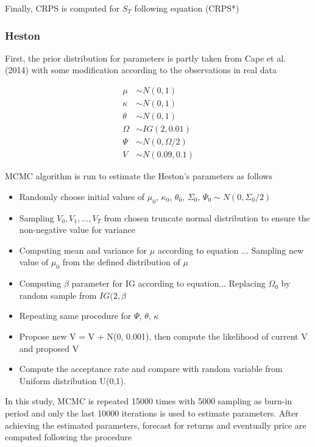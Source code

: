 \documentclass[12pt,a4paper]{article}
\numberwithin{equation}{section}
\begin{document}
Finally, CRPS is computed for $S_T$ following equation (CRPS*)

\subsubsection{Heston}

First, the prior distribution for parameters is partly taken from Cape et al. (2014) with some modification according to the observations in real data

\begin{align*}
\mu &\sim N(0,1) \\
\kappa &\sim N(0,1) \\
\theta &\sim N(0,1) \\
\Omega &\sim IG(2, 0.01) \\
\Psi &\sim N(0, \Omega/2) \\
V &\sim N(0.09, 0.1) 
\end{align*}

MCMC algorithm is run to estimate the Heston's parameters as follows

\begin{itemize}
\item Randomly choose initial values of $\mu_0$, $\kappa_0$, $\theta_0$, $\Sigma_0$, $\Psi_0 \sim N(0, \Sigma_0/2)$
\item Sampling $V_0, V_1, ..., V_T$ from chosen truncate normal distribution to ensure the non-negative value for variance 
\item Computing mean and variance for $\mu$ according to equation ... Sampling new value of $\mu_0$ from the defined distribution of $\mu$
\item Computing $\beta$ parameter for IG according to equation... Replacing $\Omega_0$ by random sample from $IG(2, \beta$
\item Repeating same procedure for $\Psi$, $\theta$, $\kappa$
\item Propose new V = V + N(0, 0.001), then compute the likelihood of current V and proposed V
\item Compute the acceptance rate and compare with random variable from Uniform distribution U(0,1).
\end{itemize}

In this study, MCMC is repeated 15000 times with 5000 sampling as burn-in period and only the last 10000 iterations is used to estimate parameters. After achieving the estimated parameters, forecast for returns and eventually price are computed following the procedure
\end{document}
